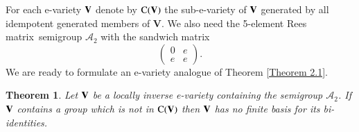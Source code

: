 \documentclass[preprint,1p,times]{elsarticle}
\numberwithin{equation}{section}
\newtheorem{Thm}{Theorem}[section]
\theoremstyle{remark}
\def\pv#1{{\bf #1}}
\def\Vc{\mathbf{V}}
\def\Co{{\mathrm C}}
\def\Rm{Rees matrix}
\begin{document}
For each e-variety $\pv V$ denote by $\Co(\pv V)$ the sub-e-variety of $\pv V$ generated by all idempotent generated
members of $\Vc$. We also need the 5-element \Rm\ semigroup $\mathcal{A}_2$ with the sandwich matrix
\begin{equation}
\label{matrix for TA}
\begin{pmatrix}
0 & e\\
e & e
\end{pmatrix}.
\end{equation} We
are ready to formulate an e-variety analogue of Theorem \ref{Theorem 2.1}.

\begin{Thm}\label{Theorem 4.4} Let $\pv V$ be a locally inverse
e-variety containing the semigroup $\mathcal{A}_2$. If $\pv V$ contains a group which is not in $\Co(\pv V)$ then $\pv
V$ has no finite basis for its bi-identities.
\end{Thm}
\end{document}
